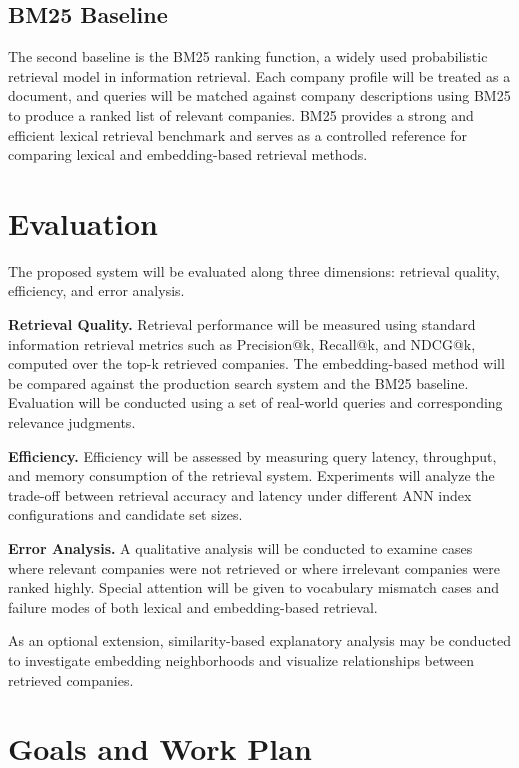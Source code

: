 \documentclass[a4paper]{scrartcl}
\begin{document}
\subsection{BM25 Baseline}

The second baseline is the BM25 ranking function, a widely used probabilistic retrieval model in information retrieval. Each company profile will be treated as a document, and queries will be matched against company descriptions using BM25 to produce a ranked list of relevant companies. BM25 provides a strong and efficient lexical retrieval benchmark and serves as a controlled reference for comparing lexical and embedding-based retrieval methods.

\section{Evaluation}

The proposed system will be evaluated along three dimensions: retrieval quality, efficiency, and error analysis.

\textbf{Retrieval Quality.}
Retrieval performance will be measured using standard information retrieval metrics such as Precision@k, Recall@k, and NDCG@k, computed over the top-k retrieved companies. The embedding-based method will be compared against the production search system and the BM25 baseline. Evaluation will be conducted using a set of real-world queries and corresponding relevance judgments.

\textbf{Efficiency.}
Efficiency will be assessed by measuring query latency, throughput, and memory consumption of the retrieval system. Experiments will analyze the trade-off between retrieval accuracy and latency under different ANN index configurations and candidate set sizes.

\textbf{Error Analysis.}
A qualitative analysis will be conducted to examine cases where relevant companies were not retrieved or where irrelevant companies were ranked highly. Special attention will be given to vocabulary mismatch cases and failure modes of both lexical and embedding-based retrieval.

As an optional extension, similarity-based explanatory analysis may be conducted to investigate embedding neighborhoods and visualize relationships between retrieved companies.

\section{Goals and Work Plan}
\end{document}
